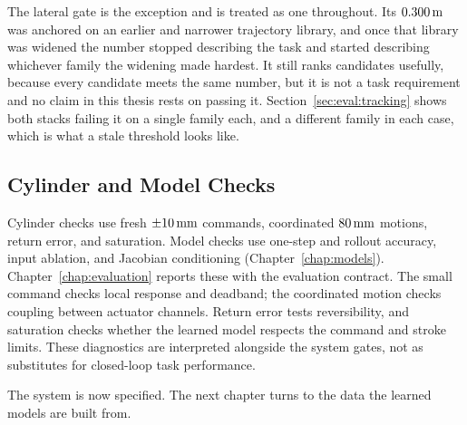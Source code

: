 The lateral gate is the exception and is treated as one throughout. Its
$\unit[0.300]{m}$ was anchored on an earlier and narrower trajectory library,
and once that library was widened the number stopped describing the task and
started describing whichever family the widening made hardest. It still ranks
candidates usefully, because every candidate meets the same number, but it is
not a task requirement and no claim in this thesis rests on passing it.
Section~\ref{sec:eval:tracking} shows both stacks failing it on a single family
each, and a different family in each case, which is what a stale threshold
looks like.

\subsection{Cylinder and Model Checks}

Cylinder checks use fresh $\pm\unit[10]{mm}$ commands, coordinated
$\unit[80]{mm}$ motions, return error, and saturation. Model checks use
one-step and rollout accuracy, input ablation, and Jacobian conditioning
(Chapter~\ref{chap:models}). Chapter~\ref{chap:evaluation} reports these with
the evaluation contract. The small command checks local response and deadband;
the coordinated motion checks coupling between actuator channels. Return error
tests reversibility, and saturation checks whether the learned model respects
the command and stroke limits. These diagnostics are interpreted alongside the
system gates, not as substitutes for closed-loop task performance.

The system is now specified. The next chapter turns to the data the learned
models are built from.
